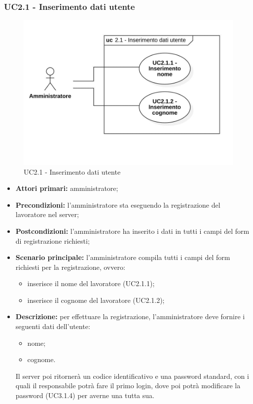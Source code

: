 \subsubsection{UC2.1 - Inserimento dati utente}

\begin{figure}[H]
	\centering
	\includegraphics[scale=0.52]{res/images/uc2-1.png}
	\caption{UC2.1 - Inserimento dati utente}
\end{figure}

\begin{itemize}
	\item 	\textbf{Attori primari:} amministratore;
	\item 	\textbf{Precondizioni:}	l'amministratore sta eseguendo la registrazione del lavoratore nel server;
	\item 	\textbf{Postcondizioni:} l'amministratore ha inserito i dati in tutti i campi del form di registrazione richiesti;
	\item 	\textbf{Scenario principale:} l'amministratore compila tutti i campi del form richiesti per la registrazione, ovvero:
	\begin{itemize}
		\item inserisce il nome del lavoratore (UC2.1.1);
		\item inserisce il cognome del lavoratore (UC2.1.2);
	\end{itemize}
	\item 	\textbf{Descrizione:} per effettuare la registrazione, l'amministratore deve fornire i seguenti dati dell'utente:
	\begin{itemize}
		\item nome;
		\item cognome.
	\end{itemize}
Il server poi ritornerà un codice identificativo e una password standard, con i quali il responsabile potrà fare il primo login, dove poi potrà modificare la password (UC3.1.4) per averne una tutta sua.
\end{itemize}

